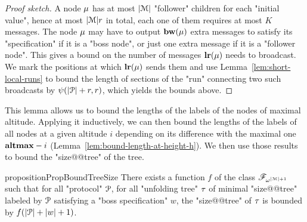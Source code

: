 \begin{proof}[Proof sketch]
	A node $\mu$ has at most $|\mathcal{M}|$ "follower" children for each "initial value", hence at most $|\mathcal{M}|r$ in total, each one of them requires at most $K$ messages. The node $\mu$ may have to output $\mathbf{bw}(\mu)$ extra messages to satisfy its "specification" if it is a "boss node", or just one extra message if it is a "follower node".
	This gives a bound on the number of messages $\mathbf{lr}(\mu)$ needs to broadcast. We mark the positions at which $\mathbf{lr}(\mu)$ sends them and use Lemma~\ref{lem:short-local-runs} to bound the length of sections of the "run" connecting two such broadcasts by $\psi(|\mathcal{P}|+r,r)$, which yields the bounds above.
\end{proof}

This lemma allows us to bound the lengths of the labels of the nodes of maximal altitude. Applying it inductively, we can then bound the lengths of the labels of all nodes at a given altitude $i$ depending on its difference with the maximal one $\mathbf{altmax}-i$ (Lemma~\ref{lem:bound-length-at-height-h}). We then use those results to bound the "size@@tree" of the tree.

 
\begin{restatable}{proposition}{PropBoundTreeSize}
	\label{prop:bound-tree-size}
	There exists a function $f$ of the class $\mathscr{F}_{\omega^{|\mathcal{M}|+1}}$ such that for all "protocol" $\mathcal{P}$, for all "unfolding tree" $\tau$ of minimal "size@@tree" labeled by $\mathcal{P}$ satisfying a "boss specification" $w$, the "size@@tree" of $\tau$ is bounded by $f(|\mathcal{P}| + |w|+1)$.
\end{restatable}

